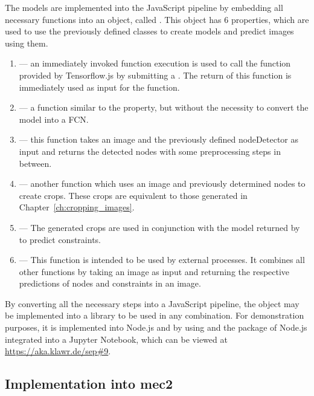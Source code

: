 The models are implemented into the JavaScript pipeline by embedding all necessary functions into an object, called .
This object has 6 properties, which are used to use the previously defined classes to create models and predict images using them.

\begin{enumerate}
    \item {} --- an immediately invoked function execution is used to call the  function provided by Tensorflow.js by submitting a .
    The return of this function is immediately used as input for the  function.
    \item {} --- a function similar to the  property, but without the necessity to convert the model into a FCN.\@
    \item {} --- this function takes an image and the previously defined nodeDetector as input and returns the detected nodes with some preprocessing steps in between.
    \item {} --- another function which uses an image and previously determined nodes to create crops. These crops are equivalent to those generated in Chapter~\ref{ch:cropping_images}.
    \item {} --- The generated crops are used in conjunction with the model returned by  to predict constraints.
    \item {} --- This function is intended to be used by external processes.
    It combines all other functions by taking an image as input and returning the respective predictions of nodes and constraints in an image.
\end{enumerate}

By converting all the necessary steps into a JavaScript pipeline, the  object may be implemented into a library to be used in any combination.
For demonstration purposes, it is implemented into Node.js %
and by using  and the  package of Node.js %
integrated into a Jupyter Notebook, which can be viewed at \url{https://aka.klawr.de/sep\#9}.

\subsection{Implementation into mec2}

